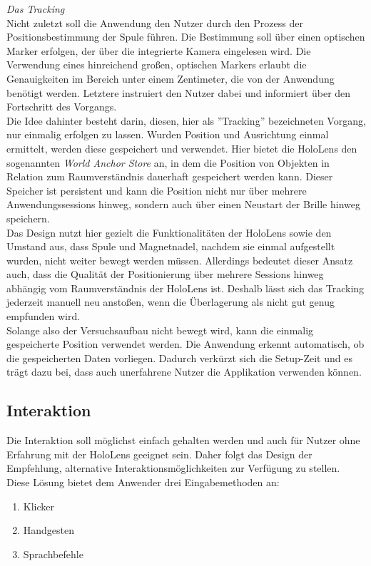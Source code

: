 \textit{Das Tracking}\\
Nicht zuletzt soll die Anwendung den Nutzer durch den Prozess der Positionsbestimmung der Spule führen. Die Bestimmung soll über einen optischen Marker erfolgen, der über die integrierte Kamera eingelesen wird. Die Verwendung eines hinreichend großen, optischen Markers erlaubt die Genauigkeiten im Bereich unter einem Zentimeter, die von der Anwendung benötigt werden. Letztere instruiert den Nutzer dabei und informiert über den Fortschritt des Vorgangs.\\

Die Idee dahinter besteht darin, diesen, hier als ''Tracking'' bezeichneten Vorgang, nur einmalig erfolgen zu lassen. Wurden Position und Ausrichtung einmal ermittelt, werden diese gespeichert und verwendet. Hier bietet die HoloLens den sogenannten \textit{World Anchor Store} an, in dem die Position von Objekten in Relation zum Raumverständnis dauerhaft gespeichert werden kann. Dieser Speicher ist persistent und kann die Position nicht nur über mehrere Anwendungssessions hinweg, sondern auch über einen Neustart der Brille hinweg speichern.\\ 

Das Design nutzt hier gezielt die Funktionalitäten der HoloLens sowie den Umstand aus, dass Spule und Magnetnadel, nachdem sie einmal aufgestellt wurden, nicht weiter bewegt werden müssen. Allerdings bedeutet dieser Ansatz auch, dass die Qualität der Positionierung über mehrere Sessions hinweg abhängig vom Raumverständnis der HoloLens ist. Deshalb lässt sich das Tracking jederzeit manuell neu anstoßen, wenn die Überlagerung als nicht gut genug empfunden wird.\\

Solange also der Versuchsaufbau nicht bewegt wird, kann die einmalig gespeicherte Position verwendet werden. Die Anwendung erkennt automatisch, ob die gespeicherten Daten vorliegen. Dadurch verkürzt sich die Setup-Zeit und es trägt dazu bei, dass auch unerfahrene Nutzer die Applikation verwenden können.

\subsection{Interaktion}
\label{sec-4-4}
Die Interaktion soll möglichst einfach gehalten werden und auch für Nutzer ohne Erfahrung mit der HoloLens geeignet sein. Daher folgt das Design der Empfehlung, alternative Interaktionsmöglichkeiten zur Verfügung zu stellen. Diese Lösung bietet dem Anwender drei Eingabemethoden an:
\begin{enumerate}
	\setlength{\itemsep}{-5pt}
	\item Klicker
	\item Handgesten
	\item Sprachbefehle
\end{enumerate}

